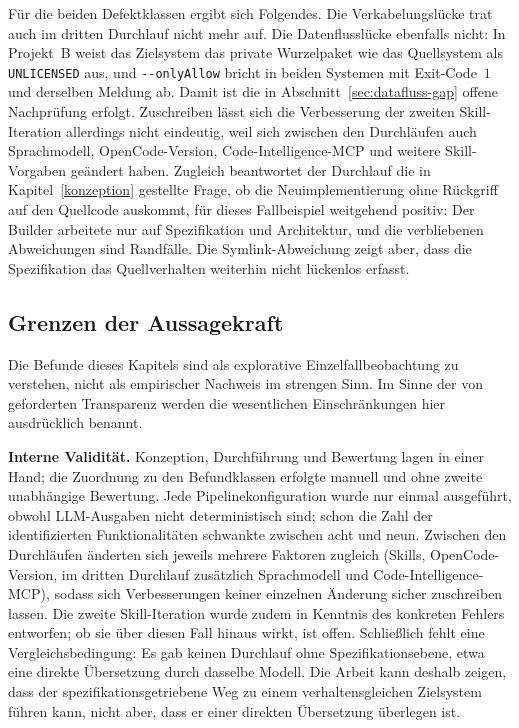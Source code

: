 Für die beiden Defektklassen ergibt sich Folgendes. Die Verkabelungslücke trat auch im dritten Durchlauf nicht mehr auf. Die Datenflusslücke ebenfalls nicht: In Projekt~B weist das Zielsystem das private Wurzelpaket wie das Quellsystem als \texttt{UNLICENSED} aus, und \texttt{-{}-onlyAllow} bricht in beiden Systemen mit Exit-Code~$1$ und derselben Meldung ab. Damit ist die in Abschnitt~\ref{sec:datafluss-gap} offene Nachprüfung erfolgt. Zuschreiben lässt sich die Verbesserung der zweiten Skill-Iteration allerdings nicht eindeutig, weil sich zwischen den Durchläufen auch Sprachmodell, OpenCode-Version, Code-Intelligence-MCP und weitere Skill-Vorgaben geändert haben. Zugleich beantwortet der Durchlauf die in Kapitel~\ref{konzeption} gestellte Frage, ob die Neuimplementierung ohne Rückgriff auf den Quellcode auskommt, für dieses Fallbeispiel weitgehend positiv: Der Builder arbeitete nur auf Spezifikation und Architektur, und die verbliebenen Abweichungen sind Randfälle. Die Symlink-Abweichung zeigt aber, dass die Spezifikation das Quellverhalten weiterhin nicht lückenlos erfasst.

\subsection{Grenzen der Aussagekraft} \label{sec:validitaet}

Die Befunde dieses Kapitels sind als explorative Einzelfallbeobachtung zu verstehen, nicht als empirischer Nachweis im strengen Sinn. Im Sinne der von \textcite{korn2026reportingprompting} geforderten Transparenz werden die wesentlichen Einschränkungen hier ausdrücklich benannt.

\textbf{Interne Validität.} Konzeption, Durchführung und Bewertung lagen in einer Hand; die Zuordnung zu den Befundklassen erfolgte manuell und ohne zweite unabhängige Bewertung. Jede Pipelinekonfiguration wurde nur einmal ausgeführt, obwohl LLM-Ausgaben nicht deterministisch sind; schon die Zahl der identifizierten Funktionalitäten schwankte zwischen acht und neun. Zwischen den Durchläufen änderten sich jeweils mehrere Faktoren zugleich (Skills, OpenCode-Version, im dritten Durchlauf zusätzlich Sprachmodell und Code-Intelligence-MCP), sodass sich Verbesserungen keiner einzelnen Änderung sicher zuschreiben lassen. Die zweite Skill-Iteration wurde zudem in Kenntnis des konkreten Fehlers entworfen; ob sie über diesen Fall hinaus wirkt, ist offen. Schließlich fehlt eine Vergleichsbedingung: Es gab keinen Durchlauf ohne Spezifikationsebene, etwa eine direkte Übersetzung durch dasselbe Modell. Die Arbeit kann deshalb zeigen, dass der spezifikationsgetriebene Weg zu einem verhaltensgleichen Zielsystem führen kann, nicht aber, dass er einer direkten Übersetzung überlegen ist.

